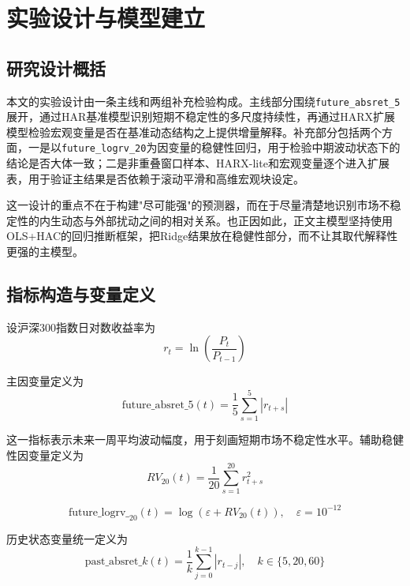 
\section{实验设计与模型建立}

\subsection{研究设计概括}

本文的实验设计由一条主线和两组补充检验构成。主线部分围绕\texttt{future\_absret\_5}展开，通过HAR基准模型识别短期不稳定性的多尺度持续性，再通过HARX扩展模型检验宏观变量是否在基准动态结构之上提供增量解释。补充部分包括两个方面，一是以\texttt{future\_logrv\_20}为因变量的稳健性回归，用于检验中期波动状态下的结论是否大体一致；二是非重叠窗口样本、HARX-lite和宏观变量逐个进入扩展表，用于验证主结果是否依赖于滚动平滑和高维宏观块设定。

这一设计的重点不在于构建"尽可能强"的预测器，而在于尽量清楚地识别市场不稳定性的内生动态与外部扰动之间的相对关系。也正因如此，正文主模型坚持使用OLS+HAC的回归推断框架，把Ridge结果放在稳健性部分，而不让其取代解释性更强的主模型。

\subsection{指标构造与变量定义}

设沪深300指数日对数收益率为
\begin{equation}
r_t=\ln\left(\frac{P_t}{P_{t-1}}\right)
\end{equation}

主因变量定义为
\begin{equation}
\text{future\_absret\_5}(t)=\frac{1}{5}\sum_{s=1}^{5}|r_{t+s}|
\end{equation}

这一指标表示未来一周平均波动幅度，用于刻画短期市场不稳定性水平。辅助稳健性因变量定义为
\begin{equation}
RV_{20}(t)=\frac{1}{20}\sum_{s=1}^{20}r_{t+s}^2
\end{equation}

\begin{equation}
\text{future\_logrv\_}_{20}(t)=\log(\varepsilon+RV_{20}(t)),\quad \varepsilon=10^{-12}
\end{equation}

历史状态变量统一定义为
\begin{equation}
\text{past\_absret\_}k(t)=\frac{1}{k}\sum_{j=0}^{k-1}|r_{t-j}|,\quad k\in\{5,20,60\}
\end{equation}

